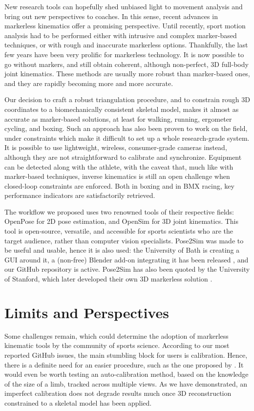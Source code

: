 New research tools can hopefully shed unbiased light to movement analysis and bring out new perspectives to coaches. In this sense, recent advances in markerless kinematics offer a promising perspective. Until recently, sport motion analysis had to be performed either with intrusive and complex marker-based techniques, or with rough and inaccurate markerless options. Thankfully, the last few years have been very prolific for markerless technology. It is now possible to go without markers, and still obtain coherent, although non-perfect, 3D full-body joint kinematics. These methods are usually more robust than marker-based ones, and they are rapidly becoming more and more accurate. 

Our decision to craft a robust triangulation procedure, and to constrain rough 3D coordinates to a biomechanically consistent skeletal model, makes it almost as accurate as marker-based solutions, at least for walking, running, ergometer cycling, and boxing. Such an approach has also been proven to work on the field, under constraints which make it difficult to set up a whole research-grade system. It is possible to use lightweight, wireless, consumer-grade cameras instead, although they are not straightforward to calibrate and synchronize. Equipment can be detected along with the athlete, with the caveat that, much like with marker-based techniques, inverse kinematics is still an open challenge when closed-loop constraints are enforced. Both in boxing and in BMX racing, key performance indicators are satisfactorily retrieved. 

The workflow we proposed uses 
two renowned tools of their respective fields: OpenPose for 2D pose estimation, and OpenSim for 3D joint kinematics. This tool is open-source, versatile, and accessible for sports scientists who are the target audience, rather than computer vision specialists. Pose2Sim was made to be useful and usable, hence it is also used: the University of Bath is creating a GUI around it, a (non-free) Blender add-on integrating it has been released \cite{Barreto2022}, and our GitHub repository is active. Pose2Sim has also been quoted by the University of Stanford, which later developed their own 3D markerless solution \cite{Uhlrich2022}. 


\section*{Limits and Perspectives}
Some challenges remain, which could determine the adoption of markerless kinematic tools by the community of sports science. According to our most reported GitHub issues, the main stumbling block for users is calibration. Hence, there is a definite need for an easier procedure, such as the one proposed by \cite{Argus}. It would even be worth testing an auto-calibration method, based on the knowledge of the size of a limb, tracked across multiple views. As we have demonstrated, an imperfect calibration does not degrade results much once 3D reconstruction constrained to a skeletal model has been applied. 

